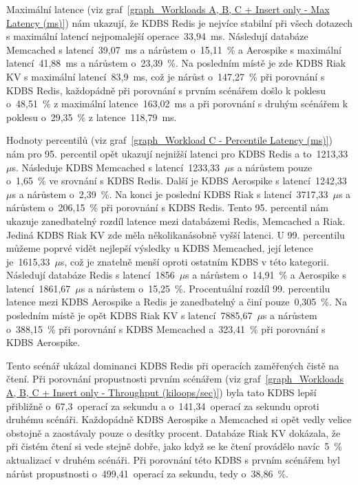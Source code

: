 \documentclass[czech,master,dept460,male,csharp,cpdeclaration]{diploma}
\begin{document}
	Maximální latence (viz graf~\ref{graph_Workloads A, B, C + Insert only - Max Latency (ms)}) nám ukazují, že KDBS Redis je nejvíce stabilní při všech dotazech s maximální latencí nejpomalejší operace~33,94~ms. Následují databáze Memcached s latencí~39,07~ms a nárůstem o~15,11~\% a Aerospike s maximální latencí~41,88~ms a nárůstem o~23,39~\%. Na posledním místě je zde KDBS Riak KV s maximální latencí~83,9~ms, což je nárůst o~147,27~\% při porovnání s KDBS Redis, každopádně při porovnání s prvním scénářem došlo k poklesu o~48,51~\% z maximální latence~163,02~ms a při porovnání s druhým scénářem k poklesu o~29,35~\% z latence~118,79~ms.
	
	Hodnoty percentilů (viz graf~\ref{graph_Workload C - Percentile Latency (ms)}) nám pro 95. percentil opět ukazují nejnižší latenci pro KDBS Redis a to~1213,33~$\mu$s. Následuje KDBS Memcached s latencí~1233,33~$\mu$s a nárůstem pouze o~1,65~\% ve srovnání s KDBS Redis. Další je KDBS Aerospike s latencí~1242,33~$\mu$s a nárůstem o~2,39~\%. Na konci je poslední KDBS Riak s latencí~3717,33~$\mu$s a nárůstem o~206,15~\% při porovnání s KDBS Redis. Tento 95. percentil nám ukazuje zanedbatelný rozdíl latence mezi databázemi Redis, Memcached a Riak. Jediná KDBS Riak KV zde měla několikanásobně vyšší latenci. U 99. percentilu můžeme poprvé vidět nejlepší výsledky u KDBS Memcached, její letence je~1615,33~$\mu$s, což je znatelně menší oproti ostatním KDBS v této kategorii. Následují databáze Redis s latencí~1856~$\mu$s a nárůstem o~14,91~\% a Aerospike s latencí~1861,67~$\mu$s a nárůstem o~15,25~\%. Procentuální rozdíl 99. percentilu latence mezi KDBS Aerospike a Redis je zanedbatelný a činí pouze~0,305~\%. Na posledním místě je opět KDBS Riak KV s latencí~7885,67~$\mu$s a nárůstem o~388,15~\% při porovnání s KDBS Memcached a~323,41~\% při porovnání s KDBS Aerospike.
	
	Tento scénář ukázal dominanci KDBS Redis při operacích zaměřených čistě na čtení. Při porovnání propustnosti prvním scénářem (viz graf~\ref{graph_Workloads A, B, C + Insert only - Throughput (kiloops/sec)}) byla tato KDBS lepší přibližně o~67,3~operací za sekundu a o~141,34~operací za sekundu oproti druhému scénáři. Každopádně KDBS Aerospike a Memcached si opět vedly velice obstojně a zaostávaly pouze o desítky procent. Databáze Riak KV dokázala, že při čistém čtení si vede stejně dobře, jako když se ke čtení provádělo navíc~5~\% aktualizací v druhém scénáři. Při porovnání této KDBS s prvním scénářem byl nárůst propustnosti o~499,41~operací za sekundu, tedy o~38,86~\%.
	
\end{document}
